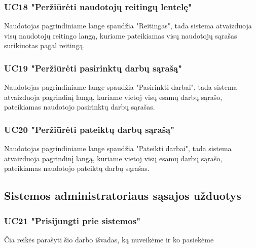 \documentclass{VUMIFPSbakalaurinis}
\begin{document}
\subsubsection{UC18 "Peržiūrėti naudotojų reitingų lentelę"}
Naudotojas pagrindiniame lange spaudžia "Reitingas", tada sistema atvaizduoja visų naudotojų reitingo langą, kuriame pateikiamas visų naudotojų sąrašas surikiuotas pagal reitingą.
\subsubsection{UC19 "Peržiūrėti pasirinktų darbų sąrašą"}
Naudotojas pagrindiniame lange spaudžia "Pasirinkti darbai", tada sistema atvaizduoja pagrindinį langą, kuriame vietoj visų esamų darbų sąrašo, pateikiamas naudotojo pasirinktų darbų sąrašas.
\subsubsection{UC20 "Peržiūrėti pateiktų darbų sąrašą"}
Naudotojas pagrindiniame lange spaudžia "Pateikti darbai", tada sistema atvaizduoja pagrindinį langą, kuriame vietoj visų esamų darbų sąrašo, pateikiamas naudotojo pateiktų darbų sąrašas.
\subsection{Sistemos administratoriaus sąsajos užduotys}
\subsubsection{UC21 "Prisijungti prie sistemos"}

Čia reikės parašyti šio darbo išvadas, ką nuveikėme ir ko pasiekėme

\printbibliography[heading=bibintoc]  %

\appendix
\end{document}
